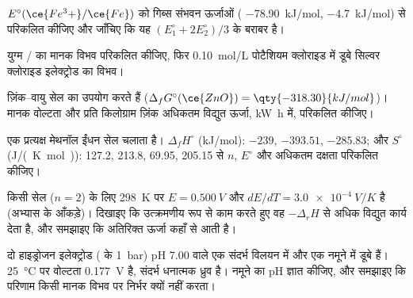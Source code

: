 \begin{exercise}[$\star\star$]\label{exo:b2:cell-thermodynamics:7}
$E^\circ(\ce{Fe^3+}/\ce{Fe})$ को गिब्स संभवन ऊर्जाओं ( \qty{-78.90}{kJ/mol},
 \qty{-4.7}{kJ/mol}) से परिकलित कीजिए और जाँचिए कि यह
$(E_1^\circ + 2E_2^\circ)/3$ के बराबर है।
\end{exercise}

\begin{exercise}[$\star\star$]\label{exo:b2:cell-thermodynamics:8}
युग्म / का मानक विभव परिकलित कीजिए, फिर
\qty{0.10}{mol/L} पोटैशियम क्लोराइड में डूबे सिल्वर क्लोराइड इलेक्ट्रोड का
विभव।
\end{exercise}

\begin{exercise}[$\star\star$]\label{exo:b2:cell-thermodynamics:9}
ज़िंक--वायु सेल  का उपयोग करते हैं ($\Delta_f G^\circ(\ce{ZnO}) =
\qty{-318.30}{kJ/mol}$)। मानक वोल्टता और प्रति किलोग्राम ज़िंक अधिकतम विद्युत
ऊर्जा, \unit{kW.h} में, परिकलित कीजिए।
\end{exercise}

\begin{exercise}[$\star\star\star$]\label{exo:b2:cell-thermodynamics:10}
एक प्रत्यक्ष मेथनॉल ईंधन सेल  चलाता है।
$\Delta_f H^\circ$ (\unit{kJ/mol}):  $-239$,  $-393.51$,
 $-285.83$; और $S^\circ$ (\unit{J/(K.mol)}):  127.2,
 213.8,  69.95,  205.15 से $n$, $E^\circ$ और
अधिकतम दक्षता परिकलित कीजिए।
\end{exercise}

\begin{exercise}[$\star\star\star$]\label{exo:b2:cell-thermodynamics:11}
किसी सेल ($n = 2$) के लिए \qty{298}{K} पर $E = \qty{0.500}{V}$ और $dE/dT = \qty{+3.0e-4}{V/K}$
है (अभ्यास के आँकड़े)। दिखाइए कि उत्क्रमणीय रूप से काम करते हुए वह
$-\Delta_r H$ से अधिक विद्युत कार्य देता है, और समझाइए कि अतिरिक्त ऊर्जा कहाँ से आती है।
\end{exercise}

\begin{exercise}[$\star\star\star$]\label{exo:b2:cell-thermodynamics:12}
दो हाइड्रोजन इलेक्ट्रोड ( के \qty{1}{bar}) pH 7.00 वाले एक संदर्भ विलयन
में और एक नमूने में डूबे हैं। \qty{25}{\degreeCelsius} पर वोल्टता \qty{0.177}{V} है,
संदर्भ धनात्मक ध्रुव है। नमूने का pH ज्ञात कीजिए, और समझाइए
कि परिणाम किसी मानक विभव पर निर्भर क्यों नहीं करता।
\end{exercise}

